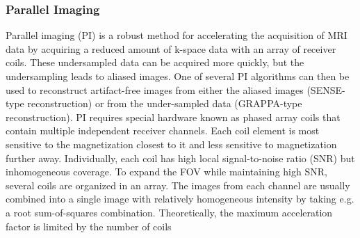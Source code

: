 \documentclass[english,version-2022-01]{uzl-thesis} %
\begin{document}
\subsubsection{Parallel Imaging}
Parallel imaging (PI) is a robust method for accelerating the acquisition of MRI data by acquiring a reduced amount of k-space data with an array of receiver coils. These undersampled data can be acquired more quickly, but the undersampling leads to aliased images. One of several PI algorithms can then be used to reconstruct artifact-free images from either the aliased images (SENSE-type reconstruction) or from the under-sampled data (GRAPPA-type reconstruction). PI requires special hardware known as phased array coils that 
contain multiple independent receiver channels. Each coil element is most sensitive to the magnetization closest to it and less sensitive to magnetization further away. 
Individually, each coil has high local signal-to-noise ratio (SNR) but inhomogeneous coverage. To expand the FOV while maintaining high SNR, several coils are organized in an array. The images from each channel are usually combined into a single image with relatively homogeneous intensity by taking e.g. a root sum-of-squares combination.
Theoretically, the maximum acceleration factor is limited by the number of coils
\end{document}
